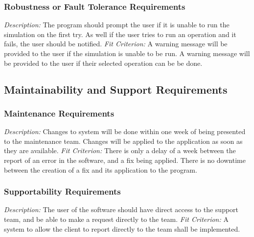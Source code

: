 \documentclass[12pt, titlepage]{article}
\begin{document}
\subsubsection{Robustness or Fault Tolerance Requirements}
\textit{Description:}\newline
The program should prompt the user if it is unable to run the simulation on the first try. As well if the user tries to run an operation and it fails, the user should be notified. 
\newline \newline 
\textit{Fit Criterion:}\newline 
A warning message will be provided to the user if the simulation is unable to be run.
A warning message will be provided to the user if their selected operation can be be done.

\subsection{Maintainability and Support Requirements}
\subsubsection{Maintenance Requirements}
\textit{Description:}\newline
Changes to system will be done within one week of being presented to the maintenance team. Changes will be applied to the application as soon as they are available.
\newline \newline 
\textit{Fit Criterion:}\newline 
There is only a delay of a week between the report of an error in the software, and a fix being applied. There is no downtime between the creation of a fix and its application to the program.

\subsubsection{Supportability Requirements}
\textit{Description:}\newline
The user of the software should have direct access to the support team, and be able to make a request directly to the team.
\newline \newline 
\textit{Fit Criterion:}\newline 
A system to allow the client to report directly to the team shall be implemented.
\end{document}
